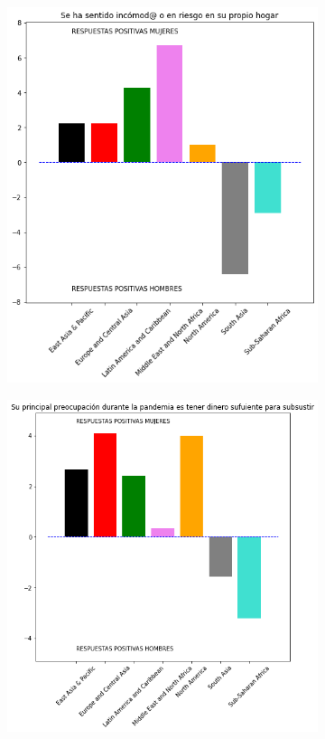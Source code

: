 \documentclass[12pt]{article}
\begin{document}
\begin{figure}
\begin{subfigure}[b]{0.45\textwidth}
         \includegraphics[width=\textwidth]{images/226.png}
         \caption{}
         \label{fig:226}
     \end{subfigure}
     \hfill
     \begin{subfigure}[b]{0.45\textwidth}
         \centering
         \includegraphics[width=\textwidth]{images/227.png}

\end{subfigure}
\end{figure}
\end{document}
